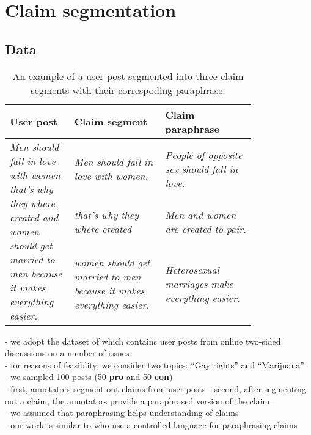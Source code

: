 \chapter{Claim segmentation}



\section{Data}

\setlength{\tabcolsep}{4pt}

\begin{table*}[t]
\begin{center}
{\footnotesize
	\begin{tabular}{@{}p{0.2\linewidth} p{0.30\linewidth} p{0.30\linewidth} }
\toprule
\textbf{User post} & \textbf{Claim segment} & \textbf{Claim paraphrase}   \\
\midrule
\multirow{3}{*}{\parbox{3cm}{
		\emph{Men should fall in love with women that's why they where created and women should 
		get married to men because it makes everything easier. }
}}
&  
\emph{Men should fall in love with women.}
& \emph{People of opposite sex should fall in love.}
\\
\cmidrule{2-3}
& \emph{that's why they where created} & \emph{Men and women are created to pair.}
 \\
\cmidrule{2-3}
& \emph{women should get married to men because it makes everything easier.} & 
 \emph{Heterosexual marriages make everything easier.}
 \\
 \bottomrule
\end{tabular}}
\end{center}
\caption{An example of a user post segmented into three claim segments with their correspoding paraphrase.}
\label{tab:claim_seg_post_segments}
\end{table*}

- we adopt the dataset of \citet{hasan2014you} which contains 
user posts from online two-sided discussions on a number of issues \\
- for reasons of feasiblity, we consider two topics: ``Gay rights'' and 
``Marijuana'' \\
- we sampled 100 posts (50 \textbf{pro} and 50 \textbf{con}) \\
- first, annotators segment out claims from user posts 
- second, after segmenting out a claim, the annotators provide a paraphrased
version of the claim \\
- we assumed that paraphrasing helps understanding of claims \\
- our work is similar to \citep{wyner2016working} who use a controlled language 
for paraphrasing claims \\

